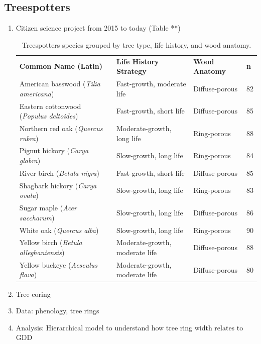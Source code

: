 \documentclass{article}
\begin{document}
\subsection{Treespotters}
\begin {enumerate}
	\item Citizen science project from 2015 to today (Table **)
\begin{table}[p]
\centering
\caption{Treespotters species grouped by tree type, life history, and wood anatomy.}
\begin{tabular}{|>{\raggedright\arraybackslash}p{6cm}|p{5cm}|p{3cm}|p{1cm}|}
\hline
\multicolumn{4}{|c|}{\textbf{Deciduous Trees}} \\
\hline
\textbf{Common Name (Latin)} & \textbf{Life History Strategy} & \textbf{Wood Anatomy} & \textbf{n} \\
\hline
American basswood (\textit{Tilia americana}) & Fast-growth, moderate life & Diffuse-porous & 82\\
Eastern cottonwood (\textit{Populus deltoides}) & Fast-growth, short life & Diffuse-porous & 85\\
Northern red oak (\textit{Quercus rubra}) & Moderate-growth, long life & Ring-porous & 88\\
Pignut hickory (\textit{Carya glabra}) & Slow-growth, long life & Ring-porous & 84\\
River birch (\textit{Betula nigra}) & Fast-growth, short life & Diffuse-porous & 85\\
Shagbark hickory (\textit{Carya ovata}) & Slow-growth, long life & Ring-porous & 83\\
Sugar maple (\textit{Acer saccharum}) & Slow-growth, long life & Diffuse-porous & 86\\
White oak (\textit{Quercus alba}) & Slow-growth, long life & Ring-porous & 90\\
Yellow birch (\textit{Betula alleghaniensis}) & Moderate-growth, moderate life & Diffuse-porous & 88\\
Yellow buckeye (\textit{Aesculus flava}) & Moderate-growth, moderate life & Diffuse-porous & 80\\
\hline
\end{tabular}
\end{table}

	\item Tree coring
	\item Data: phenology, tree rings
	\item Analysis: Hierarchical model to understand how tree ring width relates to GDD	
\end {enumerate}
\end{document}
